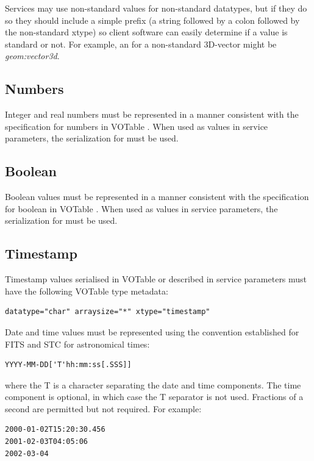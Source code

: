 \documentclass[11pt,letter]{ivoa}
\begin{document}
Services may use non-standard  values for non-standard datatypes, but if they
do so they should include a simple prefix (a string followed by a colon
followed by the non-standard xtype) so client software can easily determine
if a value is standard or not. For example, an  for a
non-standard 3D-vector might be \emph{geom:vector3d}.

\subsection{Numbers}
Integer and real numbers must be represented in a manner consistent with the
specification for numbers in VOTable \citep{2019ivoa.spec.1021O}.  When used as
values in service parameters, the serialization for  must be used.

\subsection{Boolean}
Boolean values must be represented in a manner consistent with the
specification for boolean in VOTable \citep{2019ivoa.spec.1021O}. When used as
values in service parameters, the serialization for  must be used.

\subsection{Timestamp}
Timestamp values serialised in VOTable or described in service parameters must have
the following VOTable type metadata:

\begin{verbatim}
datatype="char" arraysize="*" xtype="timestamp"
\end{verbatim}

\noindent
Date and time values must be represented  using the convention established for
FITS \citep{std:FITS} and STC \citep{2007ivoa.spec.1030R} for astronomical times:

\begin{verbatim}
YYYY-MM-DD['T'hh:mm:ss[.SSS]]
\end{verbatim}

\noindent
where the T is a character separating the date and time components. The time
component is optional, in which case the T separator is not used. Fractions of a
second are permitted but not required. For example:

\begin{verbatim}
2000-01-02T15:20:30.456
2001-02-03T04:05:06
2002-03-04
\end{verbatim}
\end{document}
